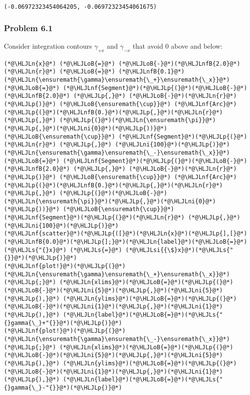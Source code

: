 \documentclass[12pt,landscape]{article}
\newcommand{\HLJLn}[1]{#1}
\newcommand{\HLJLnf}[1]{\textcolor[RGB]{66,102,213}{#1}}
\newcommand{\HLJLs}[1]{\textcolor[RGB]{201,61,57}{#1}}
\newcommand{\HLJLsi}[1]{#1}
\newcommand{\HLJLnfB}[1]{\textcolor[RGB]{59,151,46}{#1}}
\newcommand{\HLJLni}[1]{\textcolor[RGB]{59,151,46}{#1}}
\newcommand{\HLJLoB}[1]{\textcolor[RGB]{102,102,102}{\textbf{#1}}}
\newcommand{\HLJLp}[1]{#1}
\begin{document}
{\begin{lstlisting}
(-0.06972323454064205, -0.06972323454061675)
\end{lstlisting}


\subsubsection{Problem 6.1}
Consider integration contours $\gamma_{+x}$ and $\gamma_{-x}$ that avoid $0$ above and below:


\begin{lstlisting}
(*@\HLJLn{x}@*) (*@\HLJLoB{=}@*) (*@\HLJLoB{-}@*)(*@\HLJLnfB{2.0}@*)
(*@\HLJLn{r}@*) (*@\HLJLoB{=}@*) (*@\HLJLnfB{0.1}@*)
(*@\HLJLn{\ensuremath{\gamma}\ensuremath{\_+}\ensuremath{\_x}}@*) (*@\HLJLoB{=}@*) (*@\HLJLnf{Segment}@*)(*@\HLJLp{(}@*)(*@\HLJLoB{-}@*)(*@\HLJLnfB{2.0}@*) (*@\HLJLp{,}@*) (*@\HLJLoB{-}@*)(*@\HLJLn{r}@*)(*@\HLJLp{)}@*) (*@\HLJLoB{\ensuremath{\cup}}@*) (*@\HLJLnf{Arc}@*)(*@\HLJLp{(}@*)(*@\HLJLnfB{0.}@*)(*@\HLJLp{,}@*)(*@\HLJLn{r}@*)(*@\HLJLp{,}@*) (*@\HLJLp{(}@*)(*@\HLJLn{\ensuremath{\pi}}@*)(*@\HLJLp{,}@*)(*@\HLJLni{0}@*)(*@\HLJLp{))}@*) (*@\HLJLoB{\ensuremath{\cup}}@*) (*@\HLJLnf{Segment}@*)(*@\HLJLp{(}@*)(*@\HLJLn{r}@*) (*@\HLJLp{,}@*) (*@\HLJLni{100}@*)(*@\HLJLp{)}@*)
(*@\HLJLn{\ensuremath{\gamma}\ensuremath{\_-}\ensuremath{\_x}}@*) (*@\HLJLoB{=}@*) (*@\HLJLnf{Segment}@*)(*@\HLJLp{(}@*)(*@\HLJLoB{-}@*)(*@\HLJLnfB{2.0}@*) (*@\HLJLp{,}@*) (*@\HLJLoB{-}@*)(*@\HLJLn{r}@*)(*@\HLJLp{)}@*) (*@\HLJLoB{\ensuremath{\cup}}@*) (*@\HLJLnf{Arc}@*)(*@\HLJLp{(}@*)(*@\HLJLnfB{0.}@*)(*@\HLJLp{,}@*)(*@\HLJLn{r}@*)(*@\HLJLp{,}@*) (*@\HLJLp{(}@*)(*@\HLJLoB{-}@*)(*@\HLJLn{\ensuremath{\pi}}@*)(*@\HLJLp{,}@*)(*@\HLJLni{0}@*)(*@\HLJLp{))}@*) (*@\HLJLoB{\ensuremath{\cup}}@*) (*@\HLJLnf{Segment}@*)(*@\HLJLp{(}@*)(*@\HLJLn{r}@*) (*@\HLJLp{,}@*) (*@\HLJLni{100}@*)(*@\HLJLp{)}@*)
(*@\HLJLnf{scatter}@*)(*@\HLJLp{([}@*)(*@\HLJLn{x}@*)(*@\HLJLp{],[}@*)(*@\HLJLnfB{0.0}@*)(*@\HLJLp{];}@*)(*@\HLJLn{label}@*)(*@\HLJLoB{=}@*)(*@\HLJLs{"{}x}@*) (*@\HLJLs{=}@*) (*@\HLJLsi{{\$}x}@*)(*@\HLJLs{"{}}@*)(*@\HLJLp{)}@*)
(*@\HLJLnf{plot!}@*)(*@\HLJLp{(}@*)(*@\HLJLn{\ensuremath{\gamma}\ensuremath{\_+}\ensuremath{\_x}}@*) (*@\HLJLp{;}@*) (*@\HLJLn{xlims}@*)(*@\HLJLoB{=}@*)(*@\HLJLp{(}@*)(*@\HLJLoB{-}@*)(*@\HLJLni{5}@*)(*@\HLJLp{,}@*)(*@\HLJLni{5}@*)(*@\HLJLp{),}@*) (*@\HLJLn{ylims}@*)(*@\HLJLoB{=}@*)(*@\HLJLp{(}@*)(*@\HLJLoB{-}@*)(*@\HLJLni{1}@*)(*@\HLJLp{,}@*)(*@\HLJLni{1}@*)(*@\HLJLp{),}@*) (*@\HLJLn{label}@*)(*@\HLJLoB{=}@*)(*@\HLJLs{"{}gamma{\_}+"{}}@*)(*@\HLJLp{)}@*)
(*@\HLJLnf{plot!}@*)(*@\HLJLp{(}@*)(*@\HLJLn{\ensuremath{\gamma}\ensuremath{\_-}\ensuremath{\_x}}@*)(*@\HLJLp{;}@*) (*@\HLJLn{xlims}@*)(*@\HLJLoB{=}@*)(*@\HLJLp{(}@*)(*@\HLJLoB{-}@*)(*@\HLJLni{5}@*)(*@\HLJLp{,}@*)(*@\HLJLni{5}@*)(*@\HLJLp{),}@*) (*@\HLJLn{ylims}@*)(*@\HLJLoB{=}@*)(*@\HLJLp{(}@*)(*@\HLJLoB{-}@*)(*@\HLJLni{1}@*)(*@\HLJLp{,}@*)(*@\HLJLni{1}@*)(*@\HLJLp{),}@*) (*@\HLJLn{label}@*)(*@\HLJLoB{=}@*)(*@\HLJLs{"{}gamma{\_}-"{}}@*)(*@\HLJLp{)}@*)
\end{lstlisting}

}
\end{document}
